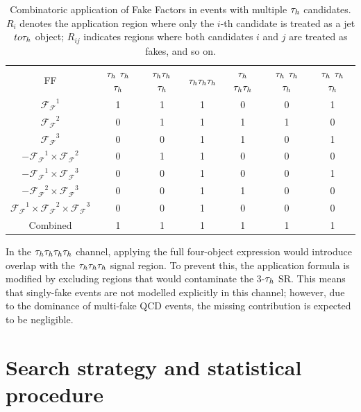 \begin{table}[h]
\centering
\begin{tabular}{ccccccc}
\toprule
FF & \textcolor{red}{$\PGt_h$} $\PGt_h$ $\PGt_h$ & \textcolor{red}{$\tau_h \tau_h$} $\PGt_h$ & \textcolor{red}{$\tau_h \tau_h \tau_h$} & $\PGt_h$ \textcolor{red}{$\tau_h \tau_h$} & $\PGt_h$ \textcolor{red}{$\PGt_h$} $\PGt_h$ & \textcolor{red}{$\PGt_h$} $\PGt_h$ \textcolor{red}{$\PGt_h$} \\

$\mathcal{F_F}^1$ & 1 & 1 & 1 & 0 & 0 & 1 \\
$\mathcal{F_F}^2$ & 0 & 1 & 1 & 1 & 1 & 0 \\
$\mathcal{F_F}^3$ & 0 & 0 & 1 & 1 & 0 & 1 \\
$-\mathcal{F_F}^1 \times \mathcal{F_F}^2$ & 0 & 1 & 1 & 0 & 0 & 0 \\
$-\mathcal{F_F}^1 \times \mathcal{F_F}^3$ & 0 & 0 & 1 & 0 & 0 & 1 \\
$-\mathcal{F_F}^2 \times \mathcal{F_F}^3$ & 0 & 0 & 1 & 1 & 0 & 0 \\
$\mathcal{F_F}^1 \times \mathcal{F_F}^2 \times\mathcal{F_F}^3$ & 0 & 0 & 1 & 0 & 0 & 0 \\
\bottomrule
Combined & 1 & 1 & 1 & 1 & 1 & 1 \\
\end{tabular}
\caption[Combinatoric application of Fake Factors for multiple $\PGt_h$ candidates.]{Combinatoric application of Fake Factors in events with multiple $\PGt_h$ candidates. $R_i$ denotes the application region where only the $i$-th candidate is treated as a jet$to\tau_h$ object; $R_{ij}$ indicates regions where both candidates $i$ and $j$ are treated as fakes, and so on.}
\label{Table:FFApplication}
\end{table}

In the $\tau_h\tau_h\tau_h\tau_h$ channel, applying the full four-object expression would introduce overlap with the $\tau_h\tau_h\tau_h$ signal region. To prevent this, the application formula is modified by excluding regions that would contaminate the 3-$\PGt_h$ SR. This means that singly-fake events are not modelled explicitly in this channel; however, due to the dominance of multi-fake QCD events, the missing contribution is expected to be negligible.


\section{Search strategy and statistical procedure}







